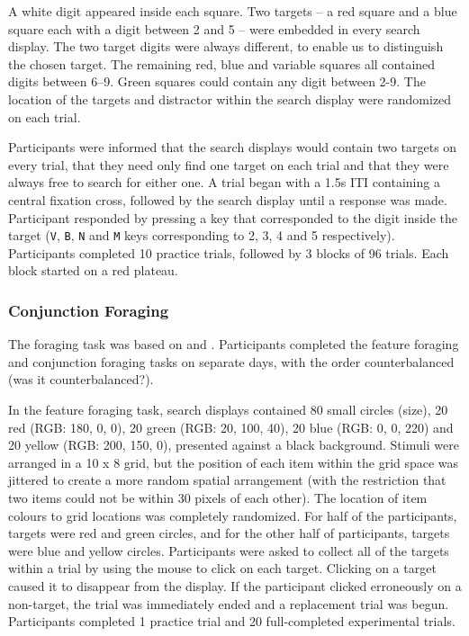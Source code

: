 \documentclass[]{rsos}%
\begin{document}
A white digit appeared inside each square. Two targets – a red square and a blue square each with a digit between 2 and 5 – were embedded in every search display. The two target digits were always different, to enable us to distinguish the chosen target. The remaining red, blue and variable squares all contained digits between 6–9. Green squares could contain any digit between 2-9. The location of the targets and distractor within the search display were randomized on each trial.

Participants were informed that the search displays would contain two targets on every trial, that they need only find one target on each trial and that they were always free to search for either one. A trial began with a 1.5s ITI containing a central fixation cross, followed by the search display until a response was made. Participant responded by pressing a key that corresponded to the digit inside the target (\texttt{V}, \texttt{B}, \texttt{N} and \texttt{M} keys corresponding to 2, 3, 4 and 5 respectively). Participants completed 10 practice trials, followed by 3 blocks of 96 trials. Each block started on a red plateau.  

\subsubsection{Conjunction Foraging}

The foraging task was based on \cite{kristjansson2014} and \cite{johannesson2016}. Participants completed the feature foraging and conjunction foraging tasks on separate days, with the order counterbalanced (was it counterbalanced?).

In the feature foraging task, search displays contained 80 small circles (size), 20 red (RGB: 180, 0, 0), 20 green (RGB: 20, 100, 40), 20 blue (RGB: 0, 0, 220) and 20 yellow (RGB: 200, 150, 0), presented against a black background. Stimuli were arranged in a 10 x 8 grid, but the position of each item within the grid space was jittered to create a more random spatial arrangement (with the restriction that two items could not be within 30 pixels of each other). The location of item colours to grid locations was completely randomized. 
For half of the participants, targets were red and green circles, and for the other half of participants, targets were blue and yellow circles. Participants were asked to collect all of the targets within a trial by using the mouse to click on each target. Clicking on a target caused it to disappear from the display. If the participant clicked erroneously on a non-target, the trial was immediately ended and a replacement trial was begun. Participants completed 1 practice trial and 20 full-completed experimental trials.
\end{document}
